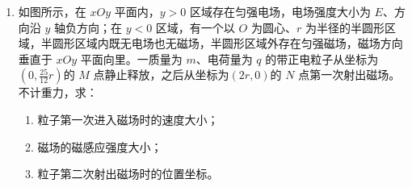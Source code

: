 \documentclass[\gkver]{gaokaozhenti}
\begin{document}
\begin{enumerate}
\begin{enumerate}
	\item
	从 $ t =0 $ 时刻开始，经多长时间质点 $ P $ 第二次到达平衡位置？
\end{enumerate}
\onepicture[align=right, w=6.26cm]{}

\item
如图所示，在 $ xOy $ 平面内，$ y >0 $ 区域存在匀强电场，电场强度大小为 $ E $、方向沿 $ y $ 轴负方向；在 $ y <0 $ 区域，有一个以 $ O $ 为圆心、$ r $ 为半径的半圆形区域，半圆形区域内既无电场也无磁场，半圆形区域外存在匀强磁场，磁场方向垂直于 $ xOy $ 平面向里。一质量为 $ m $、电荷量为 $ q $ 的带正电粒子从坐标为$( 0 , \frac{{25}}{{12}}r )$的 $ M $ 点静止释放，之后从坐标为$( 2r,0 )$的 $ N $ 点第一次射出磁场。不计重力，求：
\begin{enumerate}
	\item 
	粒子第一次进入磁场时的速度大小；
	
	\item
	磁场的磁感应强度大小；
	
	\item
	粒子第二次射出磁场时的位置坐标。
\end{enumerate}
\onepicture[align=right, h=5.61cm]{}
\end{enumerate}
\end{document}
